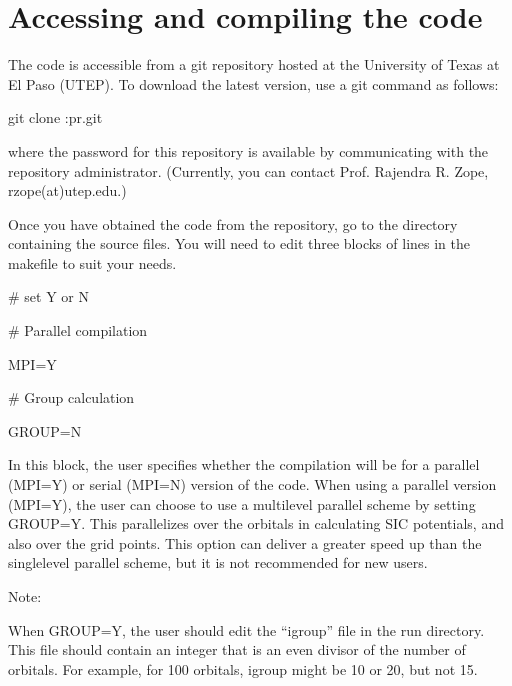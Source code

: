 \documentclass[letterpaper,10pt,english,openany,oneside]{sphinxmanual}
\begin{document}
\chapter{Accessing and compiling the code}
\label{\detokenize{docs/setupcode:accessing-and-compiling-the-code}}\label{\detokenize{docs/setupcode::doc}}
\sphinxAtStartPar
The code is accessible from a git repository hosted at the University of Texas at El Paso (UTEP).
To download the latest version, use a git command as follows:

\sphinxAtStartPar
git clone :pr.git

\sphinxAtStartPar
where the password for this repository is available by communicating with the repository administrator.
(Currently, you can contact Prof. Rajendra R. Zope, rzope(at)utep.edu.)

\sphinxAtStartPar
Once you have obtained the code from the repository, go to the directory containing the source files.  You will
need to edit three blocks of lines in the makefile to suit your needs.

\sphinxAtStartPar
{}

\sphinxAtStartPar
\# set Y or N

\sphinxAtStartPar
\# Parallel compilation

\sphinxAtStartPar
MPI=Y

\sphinxAtStartPar
\# Group calculation

\sphinxAtStartPar
GROUP=N

\sphinxAtStartPar
In this block, the user specifies whether the compilation will be for a parallel (MPI=Y) or serial (MPI=N) version of the code.
When using a parallel version (MPI=Y), the user can choose to use a multi\sphinxhyphen{}level parallel scheme by setting GROUP=Y.
This parallelizes over the orbitals in calculating SIC potentials, and also over the grid points.
This option can deliver a greater speed up than the single\sphinxhyphen{}level parallel scheme, but it is not recommended for new users.

\sphinxAtStartPar
Note:

\sphinxAtStartPar
When GROUP=Y, the user should edit the “igroup” file in the run directory.  This file should contain an integer that is
an even divisor of the number of orbitals. For example, for 100 orbitals, igroup might be 10 or 20, but not 15.

\sphinxAtStartPar
{}
\end{document}
